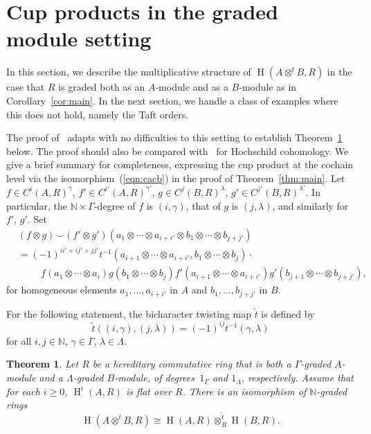 \documentclass[11pt]{amsart}
\numberwithin{equation}{section}
\newtheorem{theorem}[equation]{Theorem}
\theoremstyle{definition}
\theoremstyle{remark}
\newcommand{\g}{\gamma}
\newcommand{\N}{\mathbb{N}}
\newcommand\Homol{\operatorname{H}}
\newcommand\coh{\Homol}
\newcommand\ot{\otimes}
\newcommand\ott{\otimes^{t}\!}
\begin{document}
\section{Cup products in the graded module setting}\label{sec:cup}

In this section, we describe the multiplicative structure of $\coh(A\ott B, R)$
in the case that $R$ is graded both as an $A$-module and as a $B$-module
as in Corollary~\ref{cor:main}. 
In the next section, we handle a class of examples where this does not hold,
namely the Taft orders.


The proof of~\cite[Theorem 3.7]{BO} adapts with no difficulties to this setting
to establish Theorem~\ref{thm:cup} below.
The proof should also be compared with~\cite[Theorem 4.7]{BW} for 
Hochschild cohomology.  
We give a brief summary for completeness, 
expressing the cup product 
at the cochain level via the isomorphism~(\ref{eqn:cacb}) in the proof of 
Theorem~\ref{thm:main}.
Let $f\in C^i(A,R)^{\g}$, $f'\in C^{i'}(A,R)^{\g '}$,
$g\in C^j(B, R)^{\lambda}$, $g'\in C^{j'} (B, R)^{\lambda'}$.
In particular, the $\N\times\Gamma$-degree of $f$ is $(i,\gamma)$,
that of $g$ is $(j,\lambda)$,
and similarly for $f'$, $g'$. 
Set
\begin{equation}\label{eqn:cup}
  \begin{aligned}
&  (f\ot g)\smile (f'\ot g') (a_1\ot\cdots \ot a_{i+i'}\ot b_1\ot
  \cdots \ot b_{j+j'}) \\ & =
  (-1)^{ii' +ij' + jj'}
     t^{-1}( a_{i+1}\ot \cdots \ot a_{i+i'},  b_1\ot\cdots\ot b_j) \cdot \\
 & \hspace{1cm}f(a_1\ot \cdots \ot a_i)
      g(b_1\ot\cdots\ot b_j) 
      f'(a_{i+1}\ot\cdots\ot a_{i+i'})
      g'(b_{j+1}\ot\cdots\ot b_{j+j'}) ,
  \end{aligned}
\end{equation}
for homogeneous elements $a_1,\ldots, a_{i+i'}$ in $A$
and $b_1,\ldots, b_{j+j'}$ in $B$. 

For the following statement, the bicharacter twisting map $\widetilde{t}$
is defined by
\[
    \widetilde{t}((i,\gamma), (j, \lambda)) =
    (-1)^{ij} t^{-1}(\gamma,\lambda) 
\]
for all $i,j\in \N$, $\gamma\in\Gamma$, $\lambda\in\Lambda$. 

\begin{theorem}\label{thm:cup}
Let $R$ be a hereditary commutative ring
that is both a $\Gamma$-graded $A$-module and a $\Lambda$-graded $B$-module,
of degrees~$1_{\Gamma}$ and $1_{\Lambda}$, respectively.
Assume that for each $i\geq 0$, 
  $\coh^i(A,R)$ is flat over $R$.
There is an isomorphism of $\N$-graded rings  
  \[
  \coh (A\ott B , R)\cong 
    \coh (A, R) \ot^{\widetilde{t}}_R \coh (B, R) .  
   \]
\end{theorem}
\end{document}
